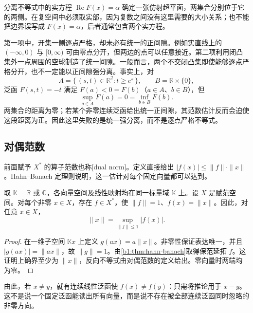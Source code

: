 分离不等式中的实方程 \(\operatorname{Re}F(x)=\alpha\) 确定一张仿射超平面，两集合分别位于它的两侧。在复空间中必须取实部，因为复数之间没有这里需要的大小关系；也不能把边界误写成 \(F(x)=\alpha\)，后者通常包含两个实方程。

\ProseParagraphBreak

第一项中，开集一侧逐点严格，却未必有统一的正间隙。例如实直线上的 \((-\infty,0)\) 与 \([0,\infty)\) 可由零点分开，但两边的点可以任意接近。第二项利用闭凸集外一点周围的空球制造了统一间隙。一般而言，两个不交闭凸集即使能够逐点严格分开，也不一定能以正间隙强分离。事实上，对
\[
A=\{\,(s,t)\in\mathbb R^2:t\geq e^s\,\},
\qquad B=\mathbb R\times\{0\},
\]
泛函 \(F(s,t)=-t\) 满足 \(F(a)<0=F(b)\)（\(a\in A\)、\(b\in B\)），但
\[
\sup_{a\in A}F(a)=0=\inf_{b\in B}F(b).
\]
两集合的距离为零；若某个非零连续泛函给出统一正间隙，其范数估计反而会迫使这段距离为正。因此这里失败的是统一强分离，而不是逐点严格不等式。

\subsection{对偶范数}
\label{b1:subsec:080204}

前面赋予 \(X^*\) 的算子范数也称[dual norm]。定义直接给出 \(|f(x)|\leq\|f\|\cdot\|x\|\)。Hahn--Banach 定理则说明，这一估计对每个固定向量都可以达到。

\begin{corollary}\label{b1:cor:norming-functional}
取 \(\mathbb K=\mathbb R\) 或 \(\mathbb C\)，各向量空间及线性映射均在同一标量域 \(\mathbb K\) 上。设 \(X\) 是赋范空间。对每个非零 \(x\in X\)，存在 \(f\in X^*\)，使 \(\|f\|=1\)、\(f(x)=\|x\|\)。因此，对任意 \(x\in X\)，
\[
\|x\|=\sup_{\|f\|\leq1}|f(x)|.
\]
\end{corollary}
\begin{proof}
在一维子空间 \(\mathbb Kx\) 上定义 \(g(ax)=a\|x\|\)。非零性保证表达唯一，并且 \(|g(ax)|=\|ax\|\)，故 \(\|g\|=1\)。由\cref{b1:thm:hahn-banach}取得保范延拓 \(f\)。这证明上确界至少为 \(\|x\|\)，反向不等式由对偶范数的定义给出。零向量时两端均为零。
\end{proof}

由此，若 \(x\ne y\)，就有连续线性泛函使 \(f(x)\ne f(y)\)：只需将推论用于 \(x-y\)。这不是说一个固定泛函能读出所有向量，而是说不存在被全部连续泛函同时忽略的非零方向。

